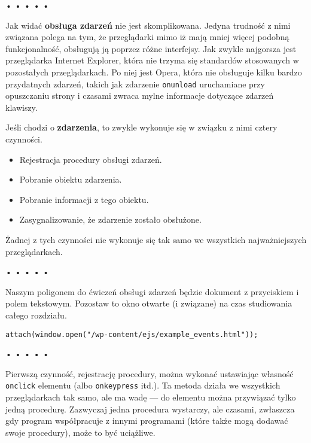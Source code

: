 \begin{center}
• • • • •
\end{center}

  
Jak widać \textbf{obsługa zdarzeń} nie jest skomplikowana. Jedyna trudność z nimi związana polega na tym, że przeglądarki mimo iż mają mniej więcej podobną funkcjonalność, obsługują ją poprzez różne interfejsy. Jak zwykle najgorsza jest przeglądarka Internet Explorer, która nie trzyma się standardów stosowanych w pozostałych przeglądarkach. Po niej jest Opera, która nie obsługuje kilku bardzo przydatnych zdarzeń, takich jak zdarzenie \texttt{onunload} uruchamiane przy opuszczaniu strony i czasami zwraca mylne informacje dotyczące zdarzeń klawiszy.

  
Jeśli chodzi o \textbf{zdarzenia}, to zwykle wykonuje się w  związku z nimi cztery czynności.

  \begin{itemize}
    \item Rejestracja procedury obsługi zdarzeń.
    \item Pobranie obiektu zdarzenia.
    \item Pobranie informacji z tego obiektu.
    \item Zasygnalizowanie, że zdarzenie zostało obsłużone.
  \end{itemize}
  
Żadnej z tych czynności nie wykonuje się tak samo we wszystkich najważniejszych przeglądarkach.



\begin{center}
• • • • •
\end{center}

  
Naszym poligonem do ćwiczeń obsługi zdarzeń będzie dokument z przyciskiem i polem tekstowym. Pozostaw to okno otwarte (i związane) na czas studiowania całego rozdziału.

  
\begin{verbatim} 
attach(window.open("/wp-content/ejs/example_events.html"));
 \end{verbatim}


\begin{center}
• • • • •
\end{center}

  
Pierwszą czynność, rejestrację procedury, można wykonać ustawiając własność \texttt{onclick} elementu (albo \texttt{onkeypress} itd.). Ta metoda działa we wszystkich przeglądarkach tak samo, ale ma wadę — do elementu można przywiązać tylko jedną procedurę. Zazwyczaj jedna procedura wystarczy, ale czasami, zwłaszcza gdy program współpracuje z innymi programami (które także mogą dodawać swoje procedury), może to być uciążliwe.


